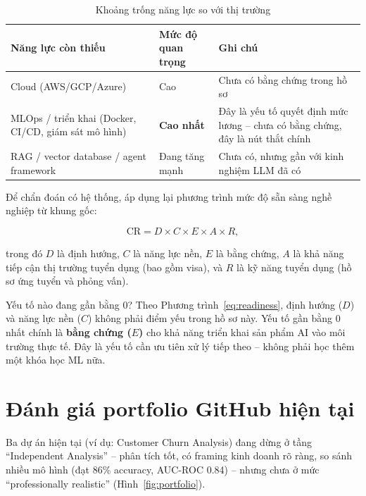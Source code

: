 \documentclass{reportkit}
\begin{document}
\begin{table}[H]
\caption{Khoảng trống năng lực so với thị trường}
\label{tab:gap}
\centering
\begin{tabular}{p{3.6cm}p{2.6cm}p{6.1cm}}
\toprule
Năng lực còn thiếu & Mức độ quan trọng & Ghi chú \\
\midrule
Cloud (AWS/GCP/Azure) & Cao & Chưa có bằng chứng trong hồ sơ \\
MLOps / triển khai (Docker, CI/CD, giám sát mô hình) & \textbf{Cao nhất} & Đây là yếu
  tố quyết định mức lương -- chưa có bằng chứng, đây là nút thắt chính \\
RAG / vector database / agent framework & Đang tăng mạnh & Chưa có, nhưng gần với
  kinh nghiệm LLM đã có \\
\bottomrule
\end{tabular}
\end{table}

Để chẩn đoán có hệ thống, áp dụng lại phương trình mức độ sẵn sàng nghề nghiệp từ
khung gốc:

\begin{equation}
  \mathrm{CR} = D \times C \times E \times A \times R,
  \label{eq:readiness}
\end{equation}

trong đó $D$ là định hướng, $C$ là năng lực nền, $E$ là bằng chứng, $A$ là khả năng
tiếp cận thị trường tuyển dụng (bao gồm visa), và $R$ là kỹ năng tuyển dụng (hồ sơ ứng
tuyển và phỏng vấn).

\begin{researchproblem}{Yếu tố nào đang gần bằng 0?}
Theo Phương trình~\ref{eq:readiness}, định hướng ($D$) và năng lực nền ($C$) không
phải điểm yếu trong hồ sơ này. Yếu tố gần bằng 0 nhất chính là \textbf{bằng chứng
($E$)} cho khả năng triển khai sản phẩm AI vào môi trường thực tế. Đây là yếu tố cần
ưu tiên xử lý tiếp theo -- không phải học thêm một khóa học ML nữa.
\end{researchproblem}

\section{Đánh giá portfolio GitHub hiện tại}
Ba dự án hiện tại (ví dụ: Customer Churn Analysis) đang dừng ở tầng ``Independent
Analysis'' -- phân tích tốt, có framing kinh doanh rõ ràng, so sánh nhiều mô hình (đạt
86\% accuracy, AUC-ROC 0.84) -- nhưng chưa ở mức ``professionally realistic''
(Hình~\ref{fig:portfolio}).
\end{document}
